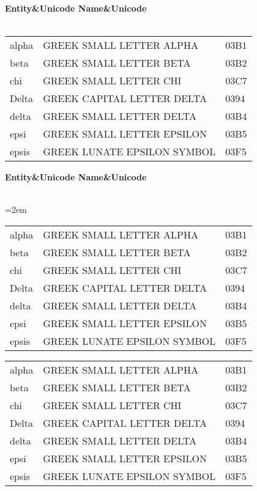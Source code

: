 \documentclass{article}
\begin{document}
\tablehead
 {\bfseries Entity&\bfseries Unicode Name&\bfseries Unicode\\ \hline}
\tabletail
 {\hline {}\\}
\tablelasttail{\hline}
\begin{supertabular}{lll}
alpha  & GREEK SMALL LETTER ALPHA      & 03B1\\
beta   & GREEK SMALL LETTER BETA       & 03B2\\
chi    & GREEK SMALL LETTER CHI        & 03C7\\
Delta  & GREEK CAPITAL LETTER DELTA    & 0394\\
delta  & GREEK SMALL LETTER DELTA      & 03B4\\
epsi   & GREEK SMALL LETTER EPSILON    & 03B5\\
epsis  & GREEK LUNATE EPSILON SYMBOL   & 03F5\\
\end{supertabular}

\tablehead
 {\bfseries Entity&\bfseries Unicode Name&\bfseries Unicode\\ \hline}
\tabletail
 {\hline {}\\}
\tablelasttail{\hline}
{\tabcolsep=2em\relax
\begin{supertabular*}{\textwidth}{lll}
alpha  & GREEK SMALL LETTER ALPHA      & 03B1\\
beta   & GREEK SMALL LETTER BETA       & 03B2\\
chi    & GREEK SMALL LETTER CHI        & 03C7\\
Delta  & GREEK CAPITAL LETTER DELTA    & 0394\\
delta  & GREEK SMALL LETTER DELTA      & 03B4\\
epsi   & GREEK SMALL LETTER EPSILON    & 03B5\\
epsis  & GREEK LUNATE EPSILON SYMBOL   & 03F5\\
\end{supertabular*}
}


\begin{mpsupertabular}{lll}
alpha  & GREEK SMALL LETTER ALPHA      & 03B1\\
beta   & GREEK SMALL LETTER BETA       & 03B2\\
chi    & GREEK SMALL LETTER CHI        & 03C7\\
Delta  & GREEK CAPITAL LETTER DELTA    & 0394\\
delta  & GREEK SMALL LETTER DELTA      & 03B4\\
epsi   & GREEK SMALL LETTER EPSILON    & 03B5\\
epsis  & GREEK LUNATE EPSILON SYMBOL   & 03F5\\
\end{mpsupertabular}
\end{document}
